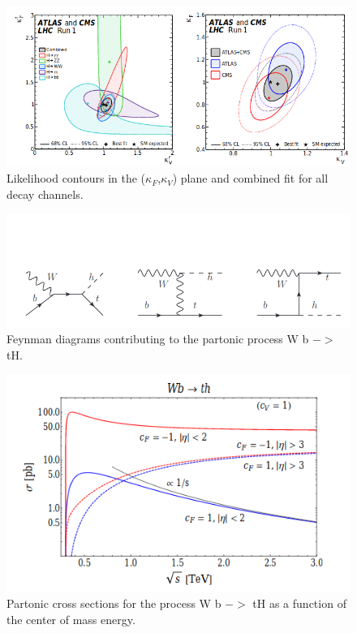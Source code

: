 \documentclass[final,3p]{CSP}
\begin{document}
\begin{figure}
  \centering
   \includegraphics[width=\columnwidth]{./cd6.png}
  \caption{Likelihood contours in the ($\kappa_F$,$\kappa_V$) plane and combined fit for all decay channels.}
   \label{figure 16}
\end{figure}

\begin{figure}
  \centering
   \includegraphics[width=\columnwidth]{./th.png}
  \caption{Feynman diagrams contributing to the partonic process W b $->$ tH.}
   \label{figure 17}
\end{figure}

\begin{figure}
  \centering
   \includegraphics[width=\columnwidth]{./th1.png}
  \caption{Partonic cross sections for the process W b $->$ tH as a function of the center of mass
energy.}
   \label{figure 18}
\end{figure}
\end{document}

